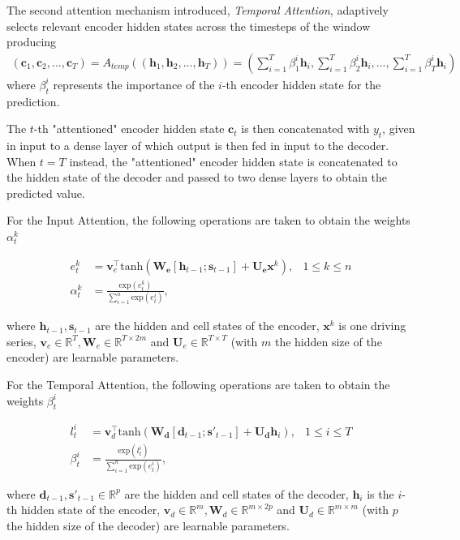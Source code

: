 \documentclass{article}
\begin{document}
The second attention mechanism introduced, \textit{Temporal Attention},
adaptively
selects relevant encoder hidden states across the timesteps of the window
producing
\begin{align*}
(\mathbf{c}_1, \mathbf{c}_2, ..., \mathbf{c}_T) = A_{temp}((\mathbf{h}_1,
\mathbf{h}_2, ..., \mathbf{h}_T)) =
\left(\sum_{i=1}^T \beta_1^i \mathbf{h}_i, \sum_{i=1}^T \beta_2^i\mathbf{h}_i,
..., \sum_{i=1}^T \beta_T^i\mathbf{h}_i \right)
\end{align*}
where $\beta^i_t$ represents the importance of the $i$-th encoder
hidden state for the prediction.

The $t$-th "attentioned" encoder hidden state $\mathbf{c}_t$ is then
concatenated with
$y_t$, given in input to a dense layer of which output is then fed in input
to the decoder. When $t = T$ instead, the "attentioned" encoder hidden state is
concatenated to the hidden state of the decoder and passed to two dense layers
to obtain the predicted value.


For the Input Attention, the following operations are taken to
obtain the weights $\alpha_t^k$

\begin{align*}
e_t^k &= \mathbf{v}_e^\top\text{tanh}(
		 \mathbf{W_e}[\mathbf{h}_{t-1};\mathbf{s}_{t-1}]
+\mathbf{U_e}\mathbf{x}^k), & 1 \le k \le n \\
\alpha_t^k &= \frac{\text{exp}(e_t^k)}{\sum_{i=1}^n \text{exp}(e_t^i)},
\end{align*}

where $\mathbf{h}_{t-1}, \mathbf{s}_{t-1}$ are the hidden and cell states
of the encoder, $\mathbf{x}^k$ is one driving series,
$\mathbf{v}_e \in \mathbb{R}^T, \mathbf{W}_e \in \mathbb{R}^{T\times 2m}$ and
$\mathbf{U}_e \in \mathbb{R}^{T\times T}$ (with $m$ the hidden size of the
encoder)
are learnable parameters.

For the Temporal Attention, the following operations are taken to
obtain the weights $\beta_t^i$

\begin{align*}
l_t^i &= \mathbf{v}_d^\top\text{tanh}(
		 \mathbf{W_d}[\mathbf{d}_{t-1};\mathbf{s}'_{t-1}]
+\mathbf{U_d}\mathbf{h}_i), & 1 \le i \le T \\
\beta_t^i &= \frac{\text{exp}(l_t^i)}{\sum_{i=1}^n \text{exp}(e_t^i)},
\end{align*}

where $\mathbf{d}_{t-1}, \mathbf{s}'_{t-1} \in \mathbb{R}^p$ are the hidden and
cell states
of the decoder, $\mathbf{h}_i$ is the $i$-th hidden state of the encoder,
$\mathbf{v}_d \in \mathbb{R}^m, \mathbf{W}_d \in \mathbb{R}^{m \times 2p}$ and
$\mathbf{U}_d \in \mathbb{R}^{m\times m}$ (with $p$ the hidden size of the
decoder)
are learnable parameters.
\end{document}
